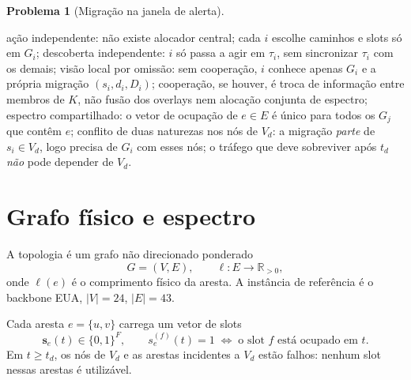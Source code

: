 \documentclass[11pt,a4paper]{article}
\theoremstyle{definition}
\newtheorem{problema}{Problema}
\begin{document}
\begin{problema}[Migração na janela de alerta]
\begin{description}[leftmargin=1.6cm,style=nextline]
  \item[\textbf{Sob}]
    ação independente: não existe alocador central; cada $i$ escolhe caminhos e slots só em $G_i$;
    descoberta independente: $i$ só passa a agir em $\tau_i$, sem sincronizar $\tau_i$ com os demais;
    visão local por omissão: sem cooperação, $i$ conhece apenas $G_i$ e a própria migração $(s_i,d_i,D_i)$;
    cooperação, se houver, é troca de informação entre membros de $K$, não fusão dos overlays nem alocação conjunta de espectro;
    espectro compartilhado: o vetor de ocupação de $e\in E$ é único para todos os $G_j$ que contêm $e$;
    conflito de duas naturezas nos nós de $V_d$: a migração \emph{parte} de $s_i\in V_d$, logo precisa de $G_i$ com esses nós; o tráfego que deve sobreviver após $t_d$ \emph{não} pode depender de $V_d$.
\end{description}
\end{problema}

\section{Grafo físico e espectro}

A topologia é um grafo não direcionado ponderado
\begin{equation}
  G=(V,E),\qquad
  \ell:E\to\mathbb{R}_{>0},
\end{equation}
onde $\ell(e)$ é o comprimento físico da aresta.
A instância de referência é o backbone EUA, $|V|=24$, $|E|=43$.

Cada aresta $e=\{u,v\}$ carrega um vetor de slots
\begin{equation}
  \mathbf{s}_e(t)\in\{0,1\}^{F},
  \qquad
  s_e^{(f)}(t)=1
  \;\Leftrightarrow\;
  \text{o slot $f$ está ocupado em $t$}.
\end{equation}
Em $t\ge t_d$, os nós de $V_d$ e as arestas incidentes a $V_d$ estão falhos: nenhum slot nessas arestas é utilizável.
\end{document}
